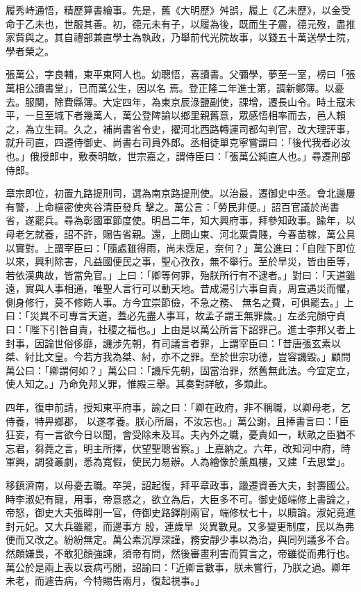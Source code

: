 \begin{pinyinscope}
 履秀峙通悟，精歷算書繪事。先是，舊《大明歷》舛誤，履上《乙未歷》，以金受命于乙未也，世服其善。初，德元未有子，以履為後，既而生子震，德元歿，盡推家貲與之。其自禮部兼直學士為執政，乃舉前代光院故事，以錢五十萬送學士院，學者榮之。



 張萬公，字良輔，東平東阿人也。幼聰悟，喜讀書。父彌學，夢至一室，榜曰「張萬相公讀書堂」，已而萬公生，因以名
 焉。登正隆二年進士第，調新鄭簿。以憂去。服闋，除費縣簿。大定四年，為東京辰淥鹽副使，課增，遷長山令。時土寇未平，一旦至城下者幾萬人，萬公登陴諭以鄉里親舊意，眾感悟相率而去，邑人賴之，為立生祠。久之，補尚書省令史，擢河北西路轉運司都勾判官，改大理評事，就升司直，四遷侍御史、尚書右司員外郎。丞相徒單克寧嘗謂曰：「後代我者必汝也。」俄授郎中，敷奏明敏，世宗嘉之，謂侍臣曰：「張萬公純直人也。」尋遷刑部侍郎。



 章宗即位，初置九路提刑司，選為南京路提刑使。以治最，遷御史中丞。會北邊屢有警，上命樞密使夾谷清臣發兵
 擊之。萬公言：「勞民非便。」詔百官議於尚書省，遂罷兵。尋為彰國軍節度使。明昌二年，知大興府事，拜參知政事。踰年，以母老乞就養，詔不許，賜告省親。還，上問山東、河北粟貴賤，今春苗稼，萬公具以實對。上謂宰臣曰：「隨處雖得雨，尚未霑足，奈何？」萬公進曰：「自陛下即位以來，興利除害，凡益國便民之事，聖心孜孜，無不舉行。至於旱災，皆由臣等，若依漢典故，皆當免官。」上曰：「卿等何罪，殆朕所行有不逮者。」對曰：「天道雖遠，實與人事相通，唯聖人言行可以動天地。昔成湯引六事自責，周宣遇災而懼，側身修行，莫不修飭人事。方今宜崇節儉，不急之務、
 無名之費，可俱罷去。」上曰：「災異不可專言天道，蓋必先盡人事耳，故孟子謂王無罪歲。」左丞完顏守貞曰：「陛下引咎自責，社稷之福也。」上由是以萬公所言下詔罪己。進士李邦乂者上封事，因論世俗侈靡，譏涉先朝，有司議言者罪，上謂宰臣曰：「昔唐張玄素以桀、紂比文皇。今若方我為桀、紂，亦不之罪。至於世宗功德，豈容譏毀。」顧問萬公曰：「卿謂何如？」萬公曰：「譏斥先朝，固當治罪，然舊無此法。今宜定立，使人知之。」乃命免邦乂罪，惟殿三舉。其奏對詳敏，多類此。



 四年，復申前請，授知東平府事，諭之曰：「卿在政府，非不稱職，以卿母老，乞侍養，特畀鄉郡，
 以遂孝養。朕心所屬，不汝忘也。」萬公謝，且捧書言曰：「臣狂妄，有一言欲今日以聞，會受除未及耳。夫內外之職，憂責如一，畎畝之臣猶不忘君，芻蕘之言，明主所擇，伏望聖聰省察。」上嘉納之。六年，改知河中府，時軍興，調發叢劇，悉為寬假，使民力易辦。人為繪像於薰風樓，又建「去思堂」。



 移鎮濟南，以母憂去職。卒哭，詔起復，拜平章政事，躐遷資善大夫，封壽國公。時李淑妃有寵，用事，帝意惑之，欲立為后，大臣多不可。御史姬端修上書論之，帝怒，御史大夫張暐削一官，侍御史路鐸削兩官，端修杖七十，以贖論。淑妃竟進封元妃。又大兵雖罷，而邊事方
 殷，連歲旱，災異數見。又多變更制度，民以為弗便而又改之。紛紛無定。萬公素沉厚深謹，務安靜少事以為治，與同列議多不合。然頗嫌畏，不敢犯顏強諫，須帝有問，然後審畫利害而質言之，帝雖從而弗行也。萬公於是兩上表以衰病丐閒，詔諭曰：「近卿言數事，朕未嘗行，乃朕之過。卿年未老，而遽告病，今特賜告兩月，復起視事。」




\end{pinyinscope}
